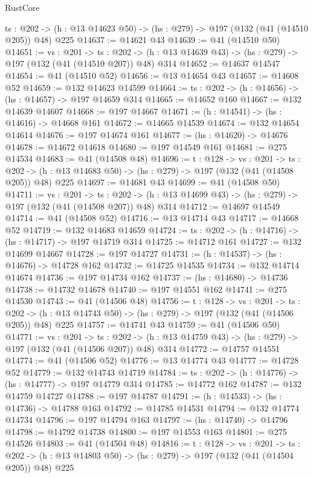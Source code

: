 \begin{lexlean}{RustCore}
\begin{coremodule}
  {ts : @202} -> (h : @13 @14623 @50) -> (hs : @279) -> @197 (@132 (@41 (@14510 @205)) @48) @225
@14637 := @14621 @43
@14639 := @41 (@14510 @50)
@14651 := {vs : @201} ->
  {ts : @202} -> (h : @13 @14639 @43) -> (hs : @279) -> @197 (@132 (@41 (@14510 @207)) @48) @314
@14652 := @14637 @14547
@14654 := @41 (@14510 @52)
@14656 := @13 @14654 @43
@14657 := @14608 @52
@14659 := @132 @14623 @14599
@14664 := {ts : @202} -> (h : @14656) -> (hs : @14657) -> @197 @14659 @314
@14665 := @14652 @160
@14667 := @132 @14639 @14607
@14668 := @197 @14667
@14671 := (h : @14541) -> (hs : @14616) -> @14668 @161
@14672 := @14665 @14539
@14674 := @132 @14654 @14614
@14676 := @197 @14674 @161
@14677 := (hs : @14620) -> @14676
@14678 := @14672 @14618
@14680 := @197 @14549 @161
@14681 := @275 @14534
@14683 := @41 (@14508 @48)
@14696 := {t : @128} ->
  {vs : @201} ->
  {ts : @202} -> (h : @13 @14683 @50) -> (hs : @279) -> @197 (@132 (@41 (@14508 @205)) @48) @225
@14697 := @14681 @43
@14699 := @41 (@14508 @50)
@14711 := {vs : @201} ->
  {ts : @202} -> (h : @13 @14699 @43) -> (hs : @279) -> @197 (@132 (@41 (@14508 @207)) @48) @314
@14712 := @14697 @14549
@14714 := @41 (@14508 @52)
@14716 := @13 @14714 @43
@14717 := @14668 @52
@14719 := @132 @14683 @14659
@14724 := {ts : @202} -> (h : @14716) -> (hs : @14717) -> @197 @14719 @314
@14725 := @14712 @161
@14727 := @132 @14699 @14667
@14728 := @197 @14727
@14731 := (h : @14537) -> (hs : @14676) -> @14728 @162
@14732 := @14725 @14535
@14734 := @132 @14714 @14674
@14736 := @197 @14734 @162
@14737 := (hs : @14680) -> @14736
@14738 := @14732 @14678
@14740 := @197 @14551 @162
@14741 := @275 @14530
@14743 := @41 (@14506 @48)
@14756 := {t : @128} ->
  {vs : @201} ->
  {ts : @202} -> (h : @13 @14743 @50) -> (hs : @279) -> @197 (@132 (@41 (@14506 @205)) @48) @225
@14757 := @14741 @43
@14759 := @41 (@14506 @50)
@14771 := {vs : @201} ->
  {ts : @202} -> (h : @13 @14759 @43) -> (hs : @279) -> @197 (@132 (@41 (@14506 @207)) @48) @314
@14772 := @14757 @14551
@14774 := @41 (@14506 @52)
@14776 := @13 @14774 @43
@14777 := @14728 @52
@14779 := @132 @14743 @14719
@14784 := {ts : @202} -> (h : @14776) -> (hs : @14777) -> @197 @14779 @314
@14785 := @14772 @162
@14787 := @132 @14759 @14727
@14788 := @197 @14787
@14791 := (h : @14533) -> (hs : @14736) -> @14788 @163
@14792 := @14785 @14531
@14794 := @132 @14774 @14734
@14796 := @197 @14794 @163
@14797 := (hs : @14740) -> @14796
@14798 := @14792 @14738
@14800 := @197 @14553 @163
@14801 := @275 @14526
@14803 := @41 (@14504 @48)
@14816 := {t : @128} ->
  {vs : @201} ->
  {ts : @202} -> (h : @13 @14803 @50) -> (hs : @279) -> @197 (@132 (@41 (@14504 @205)) @48) @225

\end{coremodule}
\end{lexlean}
